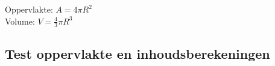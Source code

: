 

		
\begin{ftonthoud}
			Oppervlakte: $A=4\pi R^2$
		\\
		Volume: $V=\frac{4}{3}\pi R^3$
\end{ftonthoud}


\subsection{Test oppervlakte en inhoudsberekeningen}
